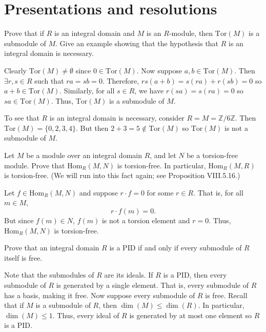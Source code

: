 \documentclass[../../master.tex]{subfiles}
\begin{document}
\section{Presentations and resolutions}

\begin{problem}
    Prove that if $R$ is an integral domain and $M$ is an $R$-module, then $\text{Tor}(M)$ is a submodule of $M$.
    Give an example showing that the hypothesis that $R$ is an integral domain is necessary.
\end{problem}

\begin{solution}
    Clearly $\text{Tor}(M) \neq \emptyset$ since $0 \in \text{Tor}(M)$.
    Now suppose $a, b \in \text{Tor}(M)$.
    Then $\exists r, s \in R$ such that $ra = sb = 0$.
    Therefore, $rs(a + b) = s(ra) + r(sb) = 0$ so $a + b \in \text{Tor}(M)$.
    Similarly, for all $s \in R$, we have $r(sa) = s(ra) = 0$ so $sa \in \text{Tor}(M)$.
    Thus, $\text{Tor}(M)$ is a submodule of $M$.

    To see that $R$ is an integral domain is necessary, consider $R = M = \mathbb{Z}/6\mathbb{Z}$.
    Then $\text{Tor}(M) = \{0, 2, 3, 4\}$.
    But then $2 + 3 = 5 \notin \text{Tor}(M)$ so $\text{Tor}(M)$ is not a submodule of $M$.
\end{solution}

\begin{problem}
    Let $M$ be a module over an integral domain $R$, and let $N$ be a torsion-free module.
    Prove that $\text{Hom}_R(M, N)$ is torsion-free.
    In particular, $\text{Hom}_R(M, R)$ is torsion-free.
    (We will run into this fact again; see Proposition VIII.5.16.)
\end{problem}

\begin{solution}
    Let $f \in \text{Hom}_R(M, N)$ and suppose $r \cdot f = 0$ for some $r \in R$.
    That is, for all $m \in M$, 
    \[
        r \cdot f(m) = 0.
    \]
    But since $f(m) \in N$, $f(m)$ is not a torsion element and $r = 0$.
    Thus, $\text{Hom}_R(M, N)$ is torsion-free.
\end{solution}

\begin{problem}
    Prove that an integral domain $R$ is a PID if and only if every submodule of $R$ itself is free.
\end{problem}

\begin{solution}
    Note that the submodules of $R$ are its ideals.
    If $R$ is a PID, then every submodule of $R$ is generated by a single element.
    That is, every submodule of $R$ has a basis, making it free.
    Now suppose every submodule of $R$ is free.
    Recall that if $M$ is a submodule of $R$, then $\dim(M) \leq \dim(R)$.
    In particular, $\dim(M) \leq 1$.
    Thus, every ideal of $R$ is generated by at most one element so $R$ is a PID.
\end{solution}
\end{document}
